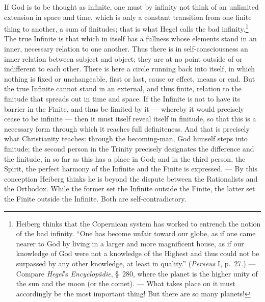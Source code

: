 \documentclass[12pt,a4paper]{book}
\newcommand{\opage}[1]{\marginnote{\footnotesize\textit{[#1]}}}
\begin{document}
If God is to be thought as infinite, one must by infinity not think of an unlimited extension in
space and time, which is only a constant transition from one finite thing to another, a sum of
finitudes; that is what Hegel calls the bad infinity.\footnote{Heiberg thinks that the Copernican
system has worked to entrench the notion of the bad infinity. ``One has become unfair toward our
globe, as if one came nearer to God by living in a larger and more magnificent house, as if our
knowledge of God were not a knowledge of the Highest and thus could not be surpassed by any other
knowledge, at least in quality.'' (\emph{Perseus} I, p.~27.) --- Compare \emph{Hegel}'s
\emph{Encyclopädie}, §~280, where the planet is the higher unity of the sun and the moon (or the
comet). --- What takes place on it must accordingly be the most important thing! But there are so
many planets!} The true Infinite is that which in itself \opage{135}has a fullness whose elements stand in an
inner, necessary relation to one another. Thus there is in self-consciousness an inner relation
between subject and object; they are at no point outside of or indifferent to each other. There is
here a circle running back into itself, in which nothing is fixed or unchangeable, first or last,
cause or effect, means or end. But the true Infinite cannot stand in an external, and thus finite,
relation to the finitude that spreads out in time and space. If the Infinite is not to have its
barrier in the Finite, and thus be limited by it --- whereby it would precisely cease to be
infinite --- then it must itself reveal itself in finitude, so that this is a necessary form
through which it reaches full definiteness. And that is precisely what Christianity teaches:
through the becoming-man, God himself steps into finitude; the second person in the Trinity
precisely designates the difference and the finitude, in so far as this has a place in God; and in
the third person, the Spirit, the perfect harmony of the Infinite and the Finite is expressed. ---
By this conception Heiberg thinks he is beyond the dispute between the Rationalists and the
Orthodox. While the former set the Infinite outside the Finite, the latter set the Finite outside
the Infinite. Both are self-contradictory.
\end{document}
